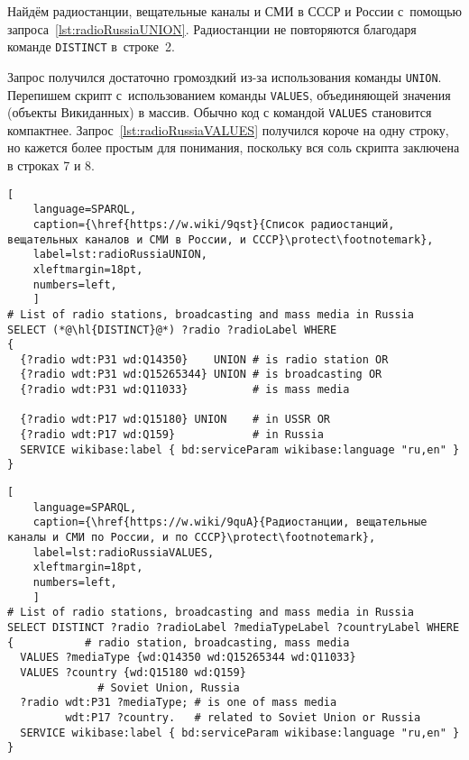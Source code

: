 Найдём радиостанции, вещательные каналы и СМИ в СССР и России 
с~помощью запроса~\ref{lst:radioRussiaUNION}. 
Радиостанции не повторяются благодаря команде \lstinline|DISTINCT| в~строке~2. 

Запрос получился достаточно громоздкий из-за использования команды \lstinline|UNION|. 
Перепишем скрипт с~использованием команды \lstinline|VALUES|, 
объединяющей значения (объекты Викиданных) в массив. 
Обычно код с командой \lstinline|VALUES| становится компактнее. 
Запрос~\ref{lst:radioRussiaVALUES} получился короче на одну строку, 
но кажется более простым для понимания, поскольку вся соль скрипта заключена 
в строках 7 и 8. 


\begin{lstlisting}[ 
    language=SPARQL,
    caption={\href{https://w.wiki/9qst}{Список радиостанций, вещательных каналов и СМИ в России, и СССР}\protect\footnotemark},
    label=lst:radioRussiaUNION,
    xleftmargin=18pt,
    numbers=left,
    ]
# List of radio stations, broadcasting and mass media in Russia 
SELECT (*@\hl{DISTINCT}@*) ?radio ?radioLabel WHERE
{
  {?radio wdt:P31 wd:Q14350}    UNION # is radio station OR
  {?radio wdt:P31 wd:Q15265344} UNION # is broadcasting OR
  {?radio wdt:P31 wd:Q11033}          # is mass media
    
  {?radio wdt:P17 wd:Q15180} UNION    # in USSR OR
  {?radio wdt:P17 wd:Q159}            # in Russia
  SERVICE wikibase:label { bd:serviceParam wikibase:language "ru,en" }
}
\end{lstlisting}%


\begin{lstlisting}[ 
    language=SPARQL,
    caption={\href{https://w.wiki/9quA}{Радиостанции, вещательные каналы и СМИ по России, и по СССР}\protect\footnotemark},
    label=lst:radioRussiaVALUES,
    xleftmargin=18pt,
    numbers=left,
    ]
# List of radio stations, broadcasting and mass media in Russia 
SELECT DISTINCT ?radio ?radioLabel ?mediaTypeLabel ?countryLabel WHERE
{           # radio station, broadcasting, mass media
  VALUES ?mediaType {wd:Q14350 wd:Q15265344 wd:Q11033}
  VALUES ?country {wd:Q15180 wd:Q159} 
              # Soviet Union, Russia
  ?radio wdt:P31 ?mediaType; # is one of mass media
         wdt:P17 ?country.   # related to Soviet Union or Russia
  SERVICE wikibase:label { bd:serviceParam wikibase:language "ru,en" }
}
\end{lstlisting}%


